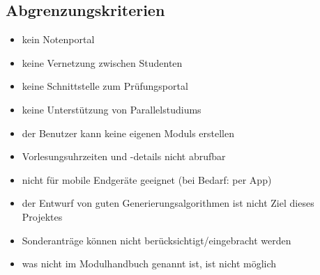 \subsection{Abgrenzungskriterien}
\begin{itemize}[nosep]
	\item kein Notenportal
	\item keine Vernetzung zwischen Studenten
	\item keine Schnittstelle zum Prüfungsportal
	\item keine Unterstützung von \glspl{Parallelstudium}
	\item der \gls{Benutzer} kann keine eigenen \glspl{Modul} erstellen
	\item Vorlesungsuhrzeiten und -details nicht abrufbar
	\item nicht für mobile Endgeräte geeignet (bei Bedarf: per App)
	\item der Entwurf von guten Generierungsalgorithmen ist nicht Ziel dieses Projektes
	\item Sonderanträge können nicht berücksichtigt/eingebracht werden
	\item was nicht im Modulhandbuch genannt ist, ist nicht möglich
\end{itemize}